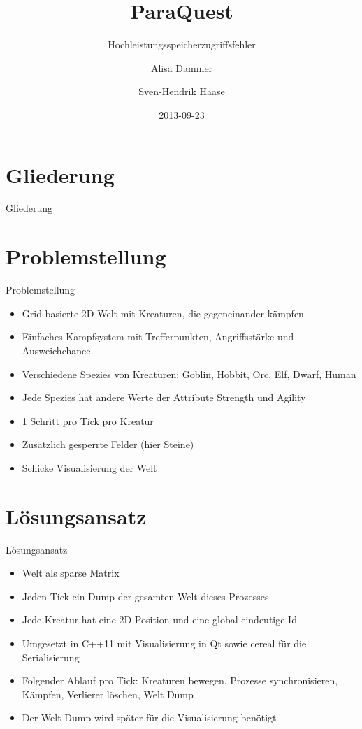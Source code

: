 \documentclass{beamer}
\begin{document}
\title{ParaQuest}
\subtitle{Hochleistungsspeicherzugriffsfehler}
\date{2013-09-23}
\author{Alisa Dammer \and Sven-Hendrik Haase}

\begin{frame}
    \titlepage
\end{frame}

\section*{Gliederung}
\begin{frame}{Gliederung}
    \tableofcontents
\end{frame}

\section{Problemstellung}
\begin{frame}{Problemstellung}
\begin{itemize}
    \item Grid-basierte 2D Welt mit Kreaturen, die gegeneinander kämpfen
    \item Einfaches Kampfsystem mit Trefferpunkten, Angriffsstärke und Ausweichchance
    \item Verschiedene Spezies von Kreaturen: Goblin, Hobbit, Orc, Elf, Dwarf, Human
    \item Jede Spezies hat andere Werte der Attribute Strength und Agility
    \item 1 Schritt pro Tick pro Kreatur
    \item Zusätzlich gesperrte Felder (hier Steine)
    \item Schicke Visualisierung der Welt
\end{itemize}
\end{frame}


\section{Lösungsansatz}
\begin{frame}{Lösungsansatz}
\begin{itemize}
    \item Welt als sparse Matrix
    \item Jeden Tick ein Dump der gesamten Welt dieses Prozesses
    \item Jede Kreatur hat eine 2D Position und eine global eindeutige Id
    \item Umgesetzt in C++11 mit Visualisierung in Qt sowie cereal für die Serialisierung
    \item Folgender Ablauf pro Tick: Kreaturen bewegen, Prozesse synchronisieren, Kämpfen, Verlierer löschen, Welt Dump
    \item Der Welt Dump wird später für die Visualisierung benötigt
\end{itemize}
\end{frame}
\end{document}
